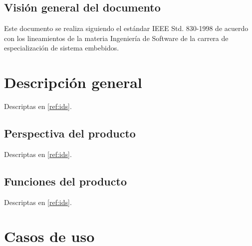 \documentclass[12pt,a4paper, twosite]{article}
\begin{document}
	
	\subsection{Visión general del documento}
	\label{sec:orgdaca22c}
	Este documento se realiza siguiendo el estándar IEEE Std. 830-1998 de acuerdo con los lineamientos de la materia Ingeniería de Software de la carrera de especialización de sistema embebidos.

	
	\section{Descripción general }
	\label{sec:orgc1c4017}
	Descriptas en \ref{ref:ids}.
	\subsection{Perspectiva del producto}
	\label{sec:org24980a8}
	Descriptas en \ref{ref:ids}.

	\subsection{Funciones del producto}
	\label{sec:orgaf51da6}
	Descriptas en \ref{ref:ids}.
	
	\section{Casos de uso}
	\label{sec:org40573d1}
		
\end{document}
